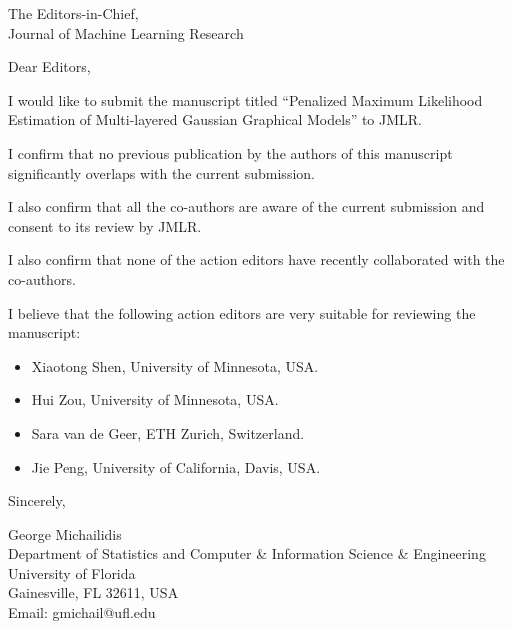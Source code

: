 \documentclass{letter}
\begin{document}
\begin{letter}{The Editors-in-Chief,\\
Journal of Machine Learning Research}
\opening{Dear Editors,}

I would like to submit the manuscript titled  “Penalized Maximum Likelihood Estimation of Multi-layered Gaussian Graphical Models” to JMLR.

I confirm that no previous publication by the authors of this manuscript significantly overlaps with the current submission.

I also confirm that all the co-authors are aware of the current submission and consent to its review by JMLR.

I also confirm that none of the action editors have recently collaborated with the co-authors.

I believe that the following action editors are very suitable for reviewing  the manuscript:

\begin{itemize}
	\item Xiaotong Shen, University of Minnesota, USA.
	\item Hui Zou, University of Minnesota, USA.
	\item Sara van de Geer, ETH Zurich, Switzerland.
	\item Jie Peng, University of California, Davis, USA. 
\end{itemize}
\closing{Sincerely,}
\flushleft
George Michailidis\\
Department of Statistics and Computer \& Information Science \& Engineering\\
University of Florida\\
Gainesville, FL 32611, USA \\
Email: gmichail@ufl.edu

\end{letter}
\end{document}
